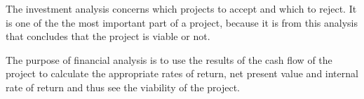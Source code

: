 The investment analysis concerns which projects to accept and which to reject. It is one of the the most important part of a project, because it is from this analysis that concludes that the project is viable or not.

The purpose of financial analysis is to use the results of the cash flow of the project to calculate the appropriate rates of return, net present value and internal rate of return and thus see the viability of the project.

